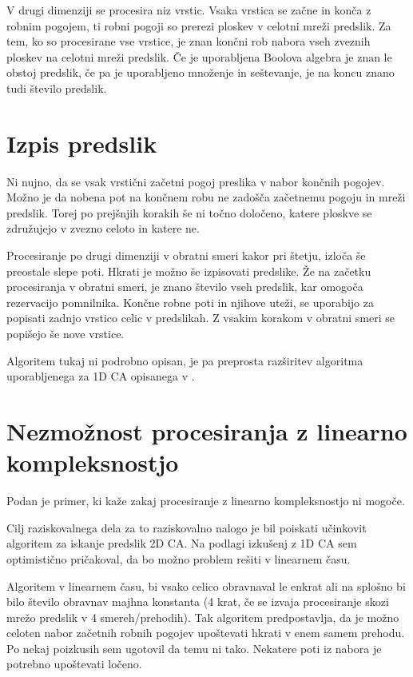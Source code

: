 \documentclass[12pt,a4paper,openany,twoside]{book}
\begin{document}
V drugi dimenziji se procesira niz vrstic. Vsaka vrstica se začne in konča
z robnim pogojem, ti robni pogoji so prerezi ploskev v celotni mreži predslik.
Za tem, ko so procesirane vse vrstice, je znan končni rob nabora vseh zveznih
ploskev na celotni mreži predslik. Če je uporabljena Boolova algebra je znan
le obstoj predslik, če pa je uporabljeno množenje in seštevanje,
je na koncu znano tudi število predslik.

\section{Izpis predslik}

Ni nujno, da se vsak vrstični začetni pogoj preslika v nabor končnih pogojev.
Možno je da nobena pot na končnem robu ne zadošča začetnemu pogoju in mreži predslik.
Torej po prejšnjih korakih še ni točno določeno, katere ploskve se združujejo v zvezno
celoto in katere ne.

Procesiranje po drugi dimenziji v obratni smeri kakor pri štetju, izloča še preostale
slepe poti. Hkrati je možno še izpisovati predslike. Že na začetku procesiranja
v obratni smeri, je znano število vseh predslik, kar omogoča rezervacijo pomnilnika.
Končne robne poti in njihove uteži, se uporabijo za popisati zadnjo vrstico celic
v predslikah. Z vsakim korakom v obratni smeri se popišejo še nove vrstice.

Algoritem tukaj ni podrobno opisan, je pa preprosta razširitev algoritma uporabljenega
za 1D CA opisanega v \cite{}.

\section{Nezmožnost procesiranja z linearno kompleksnostjo}

Podan je primer, ki kaže zakaj procesiranje z linearno kompleksnostjo ni mogoče.

Cilj raziskovalnega dela za to raziskovalno nalogo je bil poiskati
učinkovit algoritem za iskanje predslik 2D CA. Na podlagi izkušenj z 1D CA
sem optimistično pričakoval, da bo možno problem rešiti v linearnem času.

Algoritem v linearnem času, bi vsako celico obravnaval le enkrat
ali na splošno bi bilo število obravnav majhna konstanta (4 krat,
če se izvaja procesiranje skozi mrežo predslik v 4 smereh/prehodih).
Tak algoritem predpostavlja, da je možno celoten nabor začetnih
robnih pogojev upoštevati hkrati v enem samem prehodu. Po nekaj
poizkusih sem ugotovil da temu ni tako. Nekatere poti iz nabora je
potrebno upoštevati ločeno.
\end{document}
